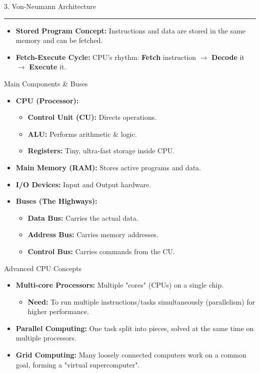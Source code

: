 \documentclass[a4paper, 8pt]{extarticle}
\newcommand{\sectionheading}[1]{%
  \par\vspace{0.6em} %
  {\headingfont\fontsize{10.5pt}{11.5pt}\selectfont\color{black}#1}\par\nopagebreak
  \rule{\linewidth}{0.4pt}\vspace{0.2em}\nopagebreak
}
\newcommand{\subsectionheading}[1]{%
  \par\vspace{0.3em}\nopagebreak
  {\headingfont\fontsize{9pt}{10pt}\selectfont\color{black!80}#1}\par\nopagebreak\vspace{-0.3em}
}
\begin{document}
\begin{multicols}{2}
\sectionheading{3. Von-Neumann Architecture}
\begin{tcolorbox}[title=Core Concepts, boxsep=2pt, top=2pt, bottom=2pt]
\begin{itemize}
    \item \textbf{Stored Program Concept:} Instructions and data are stored in the same memory and can be fetched.
    \item \textbf{Fetch-Execute Cycle:} CPU's rhythm: \textbf{Fetch} instruction $\rightarrow$ \textbf{Decode} it $\rightarrow$ \textbf{Execute} it.
\end{itemize}
\end{tcolorbox}
\subsectionheading{Main Components \& Buses}
\begin{itemize}
    \item \textbf{CPU (Processor):}
        \begin{itemize}
            \item \textbf{Control Unit (CU):} Directs operations.
            \item \textbf{ALU:} Performs arithmetic \& logic.
            \item \textbf{Registers:} Tiny, ultra-fast storage inside CPU.
        \end{itemize}
    \item \textbf{Main Memory (RAM):} Stores active programs and data.
    \item \textbf{I/O Devices:} Input and Output hardware.
    \item \textbf{Buses (The Highways):}
        \begin{itemize}
            \item \textbf{Data Bus:} Carries the actual data.
            \item \textbf{Address Bus:} Carries memory addresses.
            \item \textbf{Control Bus:} Carries commands from the CU.
        \end{itemize}
\end{itemize}
\subsectionheading{Advanced CPU Concepts}
\begin{itemize}
    \item \textbf{Multi-core Processors:} Multiple "cores" (CPUs) on a single chip.
    \begin{itemize}
        \item \textbf{Need:} To run multiple instructions/tasks simultaneously (parallelism) for higher performance.
    \end{itemize}
    \item \textbf{Parallel Computing:} One task split into pieces, solved at the same time on multiple processors.
    \item \textbf{Grid Computing:} Many loosely connected computers work on a common goal, forming a "virtual supercomputer".
\end{itemize}


\end{multicols}
\end{document}
